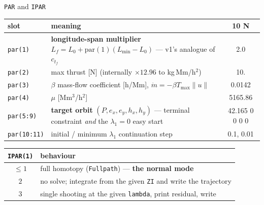 \documentclass[10pt,aspectratio=169]{beamer}
\newcommand{\code}[1]{\texttt{\small #1}}
\newcommand{\Tmax}{T_{\max}}
\newcommand{\Lf}{L_f}
\begin{document}
\begin{frame}{\code{PAR} and \code{IPAR}}

\begin{center}\small
\begin{tabular}{@{}l p{9.4cm} c@{}}
\toprule
slot & meaning & 10 N\\
\midrule
\code{par(1)} & \textbf{longitude-span multiplier}
$\Lf = L_0 + \mathrm{par}(1)(L_{\min}-L_0)$ --- v1's analogue of $c_{t_f}$ &
2.0\\
\code{par(2)} & max thrust [N] (internally $\times 12.96$ to kg\,Mm/h$^2$) &
10.\\
\code{par(3)} & $\beta$ mass-flow coefficient [h/Mm],
$\dot m = -\beta\Tmax\|u\|$ & 0.0142\\
\code{par(4)} & $\mu$ [Mm$^3$/h$^2$] & 5165.86\\
\code{par(5:9)} & \textbf{target orbit} $(P,e_x,e_y,h_x,h_y)$ --- terminal
constraint \emph{and} the $\lambda_1{=}0$ easy start & 42.165 0 0 0 0\\
\code{par(10:11)} & initial / minimum $\lambda_1$ continuation step &
0.1, 0.01\\
\bottomrule
\end{tabular}
\end{center}

\begin{center}\small
\begin{tabular}{@{}cl@{}}
\toprule
\code{IPAR(1)} & behaviour\\
\midrule
$\le 1$ & full homotopy (\code{Fullpath}) --- \textbf{the normal mode}\\
$2$ & no solve; integrate from the given \code{ZI} and write the trajectory\\
$3$ & single shooting at the given \code{lambda}, print residual, write\\
\bottomrule
\end{tabular}
\end{center}
\end{frame}
\end{document}
